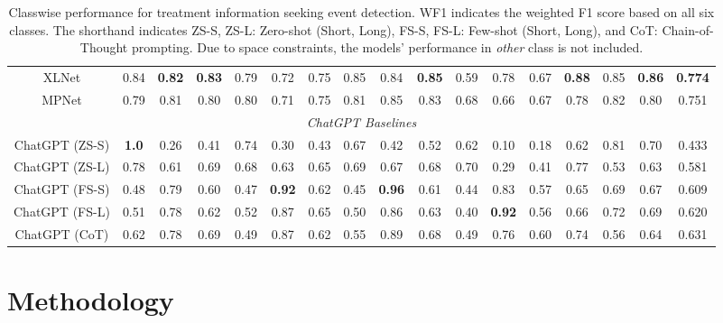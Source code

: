 \documentclass[letterpaper]{article}
\begin{document}
\begin{table}[h!]
\begin{tabular}{cccc|ccc|ccc|ccc|ccc|c}
XLNet & 0.84 & \textbf{0.82} & \textbf{0.83} & 0.79 & 0.72 & 0.75 & 0.85 & 0.84 & \textbf{0.85} & 0.59 & 0.78 & 0.67 &\textbf{0.88} & 0.85 & \textbf{0.86} & \textbf{0.774}   \\
MPNet & 0.79 & 0.81 & 0.80 & 0.80 & 0.71 & 0.75 & 0.81 & 0.85 & 0.83 & 0.68 & 0.66 & 0.67 & 0.78 & 0.82 & 0.80 & 0.751\\
\hline
\multicolumn{17}{c}{\textit{ChatGPT Baselines}}\\
\hline
ChatGPT (ZS-S) & \textbf{1.0} & 0.26  & 0.41  &  0.74 & 0.30& 0.43  &  0.67& 0.42 & 0.52  &  0.62 & 0.10 & 0.18  & 0.62 & 0.81 &  0.70  & 0.433\\
ChatGPT (ZS-L) & 0.78 &  0.61 &  0.69  &  0.68 & 0.63 & 0.65  &  0.69 & 0.67 & 0.68  &  0.70 & 0.29 & 0.41  & 0.77 & 0.53 & 0.63  & 0.581 \\
ChatGPT (FS-S) &  0.48 & 0.79 & 0.60  & 0.47 & \textbf{0.92} & 0.62  &  0.45 & \textbf{0.96} & 0.61  &  0.44 & 0.83& 0.57  & 0.65 & 0.69 &     0.67  & 0.609 \\
ChatGPT (FS-L) &  0.51  & 0.78 & 0.62  & 0.52  & 0.87 &   0.65 &  0.50 & 0.86  &  0.63  & 0.40  &   \textbf{0.92}   &   0.56  &0.66    &  0.72  &    0.69  & 0.620 \\

ChatGPT (CoT) & 0.62 & 0.78 & 0.69 & 0.49 & 0.87 & 0.62 &  0.55 &  0.89 & 0.68  &  0.49 & 0.76 & 0.60 & 0.74 & 0.56 & 0.64 & 0.631 \\
\hline
\end{tabular}
\caption{Classwise performance for treatment information seeking event detection. WF1 indicates the weighted F1 score based on all six classes. The shorthand indicates ZS-S, ZS-L: Zero-shot (Short, Long), FS-S, FS-L: Few-shot (Short, Long), and CoT: Chain-of-Thought prompting. Due to space constraints, the models' performance in \textit{other} class is not included. }
\label{all-results}
\end{table}
\section{Methodology}
\end{document}
